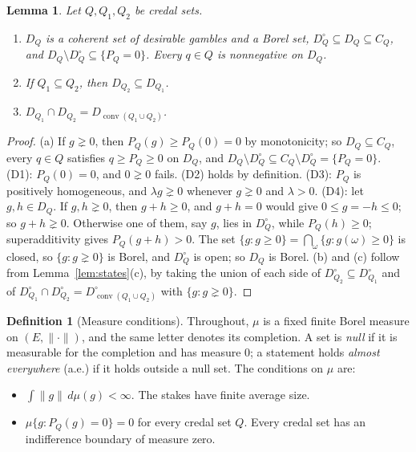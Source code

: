 \documentclass[11pt]{article}
\newtheorem{lemma}[theorem]{Lemma}
\theoremstyle{definition}
\newtheorem{definition}[theorem]{Definition}
\DeclareMathOperator{\conv}{conv}
\begin{document}
\begin{lemma}\label{lem:DQ}
Let $Q,Q_1,Q_2$ be credal sets.
\begin{enumerate}[label=(\alph*)]
\item $D_Q$ is a coherent set of desirable gambles and a Borel set, $D^\circ_Q\subseteq D_Q\subseteq C_Q$, and $D_Q\setminus D^\circ_Q\subseteq\{P_Q=0\}$. Every $q\in Q$ is nonnegative on $D_Q$.
\item If $Q_1\subseteq Q_2$, then $D_{Q_2}\subseteq D_{Q_1}$.
\item $D_{Q_1}\cap D_{Q_2}=D_{\conv(Q_1\cup Q_2)}$.
\end{enumerate}
\end{lemma}
\begin{proof}
(a) If $g\gneq0$, then $P_Q(g)\ge P_Q(0)=0$ by monotonicity; so $D_Q\subseteq C_Q$, every $q\in Q$ satisfies $q\ge P_Q\ge0$ on $D_Q$, and $D_Q\setminus D^\circ_Q\subseteq C_Q\setminus D^\circ_Q=\{P_Q=0\}$. (D1): $P_Q(0)=0$, and $0\gneq0$ fails. (D2) holds by definition. (D3): $P_Q$ is positively homogeneous, and $\lambda g\gneq0$ whenever $g\gneq0$ and $\lambda>0$. (D4): let $g,h\in D_Q$. If $g,h\gneq0$, then $g+h\ge0$, and $g+h=0$ would give $0\le g=-h\le0$; so $g+h\gneq0$. Otherwise one of them, say $g$, lies in $D^\circ_Q$, while $P_Q(h)\ge0$; superadditivity gives $P_Q(g+h)>0$. The set $\{g:g\ge0\}=\bigcap_\omega\{g:g(\omega)\ge0\}$ is closed, so $\{g:g\gneq0\}$ is Borel, and $D^\circ_Q$ is open; so $D_Q$ is Borel.
(b) and (c) follow from Lemma~\ref{lem:states}(c), by taking the union of each side of $D^\circ_{Q_2}\subseteq D^\circ_{Q_1}$ and of $D^\circ_{Q_1}\cap D^\circ_{Q_2}=D^\circ_{\conv(Q_1\cup Q_2)}$ with $\{g:g\gneq0\}$.
\end{proof}

\begin{definition}[Measure conditions]\label{def:measure}
Throughout, $\mu$ is a fixed finite Borel measure on $(E,\|\cdot\|)$, and the same letter denotes its completion. A set is \emph{null} if it is measurable for the completion and has measure $0$; a statement holds \emph{almost everywhere} (a.e.) if it holds outside a null set. The conditions on $\mu$ are:
\begin{itemize}[leftmargin=3em]
\item[(M1)] $\int\|g\|\,d\mu(g)<\infty$. The stakes have finite average size.
\item[(M2)] $\mu\{g:P_Q(g)=0\}=0$ for every credal set $Q$. Every credal set has an indifference boundary of measure zero.
\end{itemize}
\end{definition}
\end{document}
